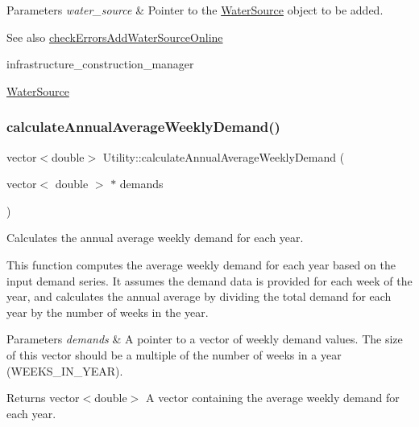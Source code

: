 \begin{DoxyParams}{Parameters}
{\em water\+\_\+source} & Pointer to the \mbox{\hyperlink{classWaterSource}{Water\+Source}} object to be added.\\
\hline
\end{DoxyParams}
\begin{DoxySeeAlso}{See also}
\mbox{\hyperlink{classUtility_a0674d7d95f4d6595f7e01817a4d84a98}{check\+Errors\+Add\+Water\+Source\+Online}} 

infrastructure\+\_\+construction\+\_\+manager 

\mbox{\hyperlink{classWaterSource}{Water\+Source}} 
\end{DoxySeeAlso}
\mbox{\label{classUtility_a5bae4fe8c3f0c782f0cdf5d14b7b92a7}} 
\subsubsection{\texorpdfstring{calculate\+Annual\+Average\+Weekly\+Demand()}{calculateAnnualAverageWeeklyDemand()}}
{\footnotesize\ttfamily vector$<$double$>$ Utility\+::calculate\+Annual\+Average\+Weekly\+Demand (\begin{DoxyParamCaption}\item[{vector$<$ double $>$ $\ast$}]{demands }\end{DoxyParamCaption})}



Calculates the annual average weekly demand for each year. 

This function computes the average weekly demand for each year based on the input demand series. It assumes the demand data is provided for each week of the year, and calculates the annual average by dividing the total demand for each year by the number of weeks in the year.


\begin{DoxyParams}{Parameters}
{\em demands} & A pointer to a vector of weekly demand values. The size of this vector should be a multiple of the number of weeks in a year (W\+E\+E\+K\+S\+\_\+\+I\+N\+\_\+\+Y\+E\+AR).\\
\hline
\end{DoxyParams}
\begin{DoxyReturn}{Returns}
vector$<$double$>$ A vector containing the average weekly demand for each year. 
\end{DoxyReturn}
\mbox{\label{classUtility_a38381b003d13986e37757dfea683f7f9}} 
